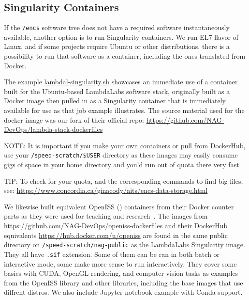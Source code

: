 \subsection{Singularity Containers}
\label{sect:singularity-containers}

If the \texttt{/encs} software tree does not have a required software
instantaneously available, another option is to run Singularity
containers. We run EL7 flavor of Linux, and if some projects
require Ubuntu or other distributions, there is a possibility
to run that software as a container, including the ones
translated from Docker.

The example
  \href{https://github.com/NAG-DevOps/speed-hpc/blob/master/src/lambdal-singularity.sh}
  {lambdal-singularity.sh}
showcases an immediate use of a container built for the Ubuntu-based
LambdaLabs software stack, originally built as a Docker image then
pulled in as a Singularity container that is immediately available
for use as that job example illustrates. The source material
used for the docker image was our fork of their official
repo: \url{https://github.com/NAG-DevOps/lambda-stack-dockerfiles}

NOTE: It is important if you make your own containers or pull from
DockerHub, use your \verb+/speed-scratch/$USER+ directory as these
images may easily consume gigs of space in your home directory
and you'd run out of quota there very fast.

TIP: To check for your quota, and the corresponding commands
to find big files, see: \url{https://www.concordia.ca/ginacody/aits/encs-data-storage.html}

We likewise built equivalent OpenISS ()
containers from their Docker counter parts as they were used for teaching and
research~\cite{oi-containers-poster-siggraph2023}. The
images from \url{https://github.com/NAG-DevOps/openiss-dockerfiles}
and their DockerHub equivalents \url{https://hub.docker.com/u/openiss}
are found in the same public directory on \verb+/speed-scratch/nag-public+
as the LambdaLabs Singularity image. They all have \texttt{.sif} extension.
Some of them can be ran in both batch or interactive mode, some
make more sense to run interactively. They cover some basics with CUDA,
OpenGL rendering, and computer vision tasks as examples from the OpenISS
library and other libraries, including the base images that use diffrent
distros. We also include Jupyter notebook example with Conda support.

